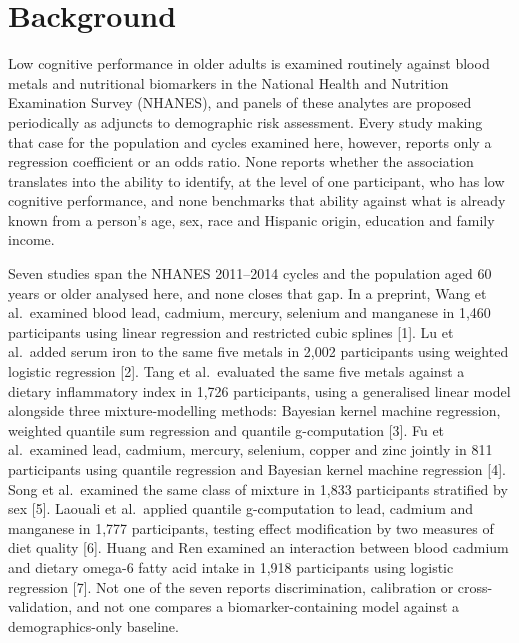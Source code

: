 \documentclass[12pt]{article}
\begin{document}
\clearpage

\section*{Background}

Low cognitive performance in older adults is examined routinely against blood metals and nutritional biomarkers in the National Health and Nutrition Examination Survey (NHANES), and panels of these analytes are proposed periodically as adjuncts to demographic risk assessment. Every study making that case for the population and cycles examined here, however, reports only a regression coefficient or an odds ratio. None reports whether the association translates into the ability to identify, at the level of one participant, who has low cognitive performance, and none benchmarks that ability against what is already known from a person's age, sex, race and Hispanic origin, education and family income.

Seven studies span the NHANES 2011--2014 cycles and the population aged 60 years or older analysed here, and none closes that gap. In a preprint, Wang et al.\ examined blood lead, cadmium, mercury, selenium and manganese in 1,460 participants using linear regression and restricted cubic splines [1]. Lu et al.\ added serum iron to the same five metals in 2,002 participants using weighted logistic regression [2]. Tang et al.\ evaluated the same five metals against a dietary inflammatory index in 1,726 participants, using a generalised linear model alongside three mixture-modelling methods: Bayesian kernel machine regression, weighted quantile sum regression and quantile g-computation [3]. Fu et al.\ examined lead, cadmium, mercury, selenium, copper and zinc jointly in 811 participants using quantile regression and Bayesian kernel machine regression [4]. Song et al.\ examined the same class of mixture in 1,833 participants stratified by sex [5]. Laouali et al.\ applied quantile g-computation to lead, cadmium and manganese in 1,777 participants, testing effect modification by two measures of diet quality [6]. Huang and Ren examined an interaction between blood cadmium and dietary omega-6 fatty acid intake in 1,918 participants using logistic regression [7]. Not one of the seven reports discrimination, calibration or cross-validation, and not one compares a biomarker-containing model against a demographics-only baseline.
\end{document}
